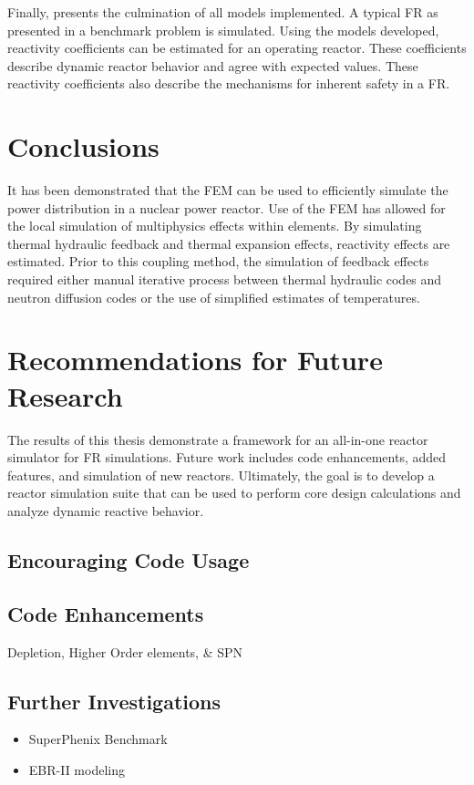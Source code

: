   Finally,  presents the culmination of all models
  implemented. A typical FR as presented in a benchmark problem is simulated.
  Using the models developed, reactivity coefficients can be estimated for an
  operating reactor. These coefficients describe dynamic reactor behavior and
  agree with expected values. These reactivity coefficients also describe the
  mechanisms for inherent safety in a FR.

\section{Conclusions}
  
  It has been demonstrated that the FEM can be used to efficiently simulate the
  power distribution in a nuclear power reactor. Use of the FEM has allowed for 
  the local simulation of multiphysics effects within elements. By simulating
  thermal hydraulic feedback and thermal expansion effects, reactivity effects
  are estimated. Prior to this coupling method, the simulation of feedback
  effects required either manual iterative process between thermal hydraulic 
  codes and neutron diffusion codes or the use of simplified estimates of 
  temperatures. 
  
\section{Recommendations for Future Research}

  The results of this thesis demonstrate a framework for an all-in-one reactor 
  simulator for FR simulations. Future work includes code enhancements,
  added features, and simulation of new reactors. Ultimately, the goal is to
  develop a reactor simulation suite that can be used to perform core design
  calculations and analyze dynamic reactive behavior.

  \subsection{Encouraging Code Usage}
    

  \subsection{Code Enhancements}
    Depletion, Higher Order elements, \& SPN
 
  \subsection{Further Investigations}
    \begin{itemize}
      \item SuperPhenix Benchmark
      \item EBR-II modeling
    \end{itemize}
